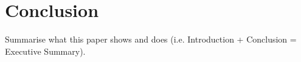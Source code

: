 \documentclass[a4paper,11pt,oneside]{report}
\newcommand{\setlinespacing}[1]
           {\renewcommand{\baselinestretch}{#1}\small\normalsize}
\theoremstyle{plain}
\theoremstyle{definition}
\begin{document}
\chapter{Conclusion}
Summarise what this paper shows and does (i.e. Introduction + Conclusion = Executive Summary).


\clearpage
\setlinespacing{1}


\end{document}
